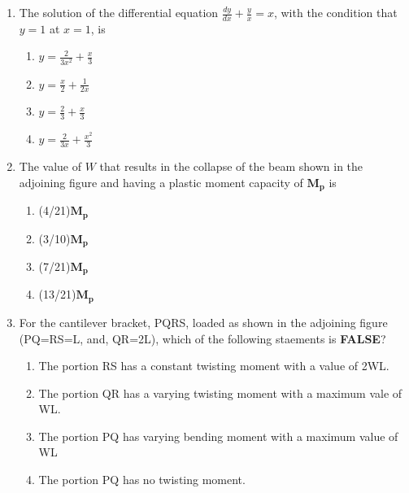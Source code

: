 \documentclass[journal,12pt,onecolumn]{IEEEtran}
\theoremstyle{remark}
\begin{document}
\begin{enumerate}
\item The solution of the differential equation $\frac{dy}{dx}+\frac{y}{x}=x$, with the condition that $y=1$ at $x=1$, is
	\begin{multicols}{4}
	\begin{enumerate}
		\item $y=\frac{2}{3x^{2}}+\frac{x}{3}$
		\item $y=\frac{x}{2}+\frac{1}{2x}$
 		\item $y=\frac{2}{3}+\frac{x}{3}$
		\item $y=\frac{2}{3x}+\frac{x^{2}}{3}$
	\end{enumerate}
	\end{multicols}

\item The value of $W$ that results in the collapse of the beam shown in the adjoining figure and having a plastic moment capacity of $\mathbf{M_{p}}$ is
\begin{figure}[ht]
\centering

\end{figure}
	\begin{multicols}{4}
	\begin{enumerate}
		\item (4/21)$\mathbf{M_{p}}$
		\item (3/10)$\mathbf{M_{p}}$
		\item (7/21)$\mathbf{M_{p}}$
		\item (13/21)$\mathbf{M_{p}}$
	\end{enumerate}
	\end{multicols}

\item For the cantilever bracket, PQRS, loaded as shown in the adjoining figure (PQ=RS=L, and, QR=2L), which of the following staements is \textbf{FALSE}?
\begin{figure}[h!]
\centering

\end{figure}
	\begin{enumerate}
		\item The portion RS has a constant twisting moment with a value of 2WL.
		\item The portion QR has a varying twisting moment with a maximum vale of WL.
		\item The portion PQ has varying bending moment with a maximum value of WL
		\item The portion PQ has no twisting moment.
	\end{enumerate}


\end{enumerate}
\end{document}
